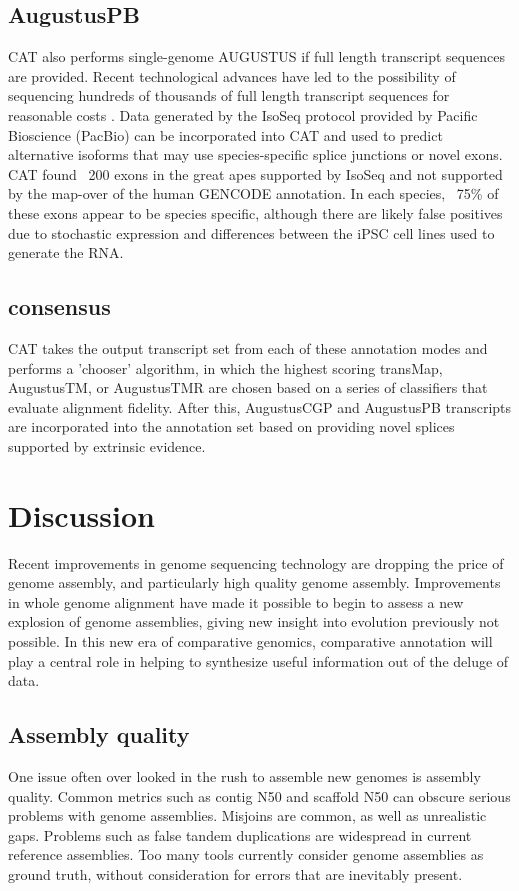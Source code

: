 \documentclass[fleqn,10pt]{wlscirep}
\begin{document}
\subsection*{AugustusPB}
CAT also performs single-genome AUGUSTUS if full length transcript sequences are provided. Recent technological advances have led to the possibility of sequencing hundreds of thousands of full length transcript sequences for reasonable costs \cite{korlach2017novo}. Data generated by the IsoSeq protocol provided by Pacific Bioscience (PacBio) \cite{gonzalez2016introduction} can be incorporated into CAT and used to predict alternative isoforms that may use species-specific splice junctions or novel exons. CAT found ~200 exons in the great apes supported by IsoSeq and not supported by the map-over of the human GENCODE annotation. In each species, ~75\% of these exons appear to be species specific, although there are likely false positives due to stochastic expression and differences between the iPSC cell lines used to generate the RNA.

\subsection*{consensus}

CAT takes the output transcript set from each of these annotation modes and performs a 'chooser' algorithm, in which the highest scoring transMap, AugustusTM, or AugustusTMR are chosen based on a series of classifiers that evaluate alignment fidelity. After this, AugustusCGP and AugustusPB transcripts are incorporated into the annotation set based on providing novel splices supported by extrinsic evidence.

\section*{Discussion}
Recent improvements in genome sequencing technology are dropping the price of genome assembly, and particularly high quality genome assembly. Improvements in whole genome alignment have made it possible to begin to assess a new explosion of genome assemblies, giving new insight into evolution previously not possible. In this new era of comparative genomics, comparative annotation will play a central role in helping to synthesize useful information out of the deluge of data.

\subsection*{Assembly quality}
One issue often over looked in the rush to assemble new genomes is assembly quality. Common metrics such as contig N50 and scaffold N50 can obscure serious problems with genome assemblies. Misjoins are common, as well as unrealistic gaps. Problems such as false tandem duplications are widespread in current reference assemblies. Too many tools currently consider genome assemblies as ground truth, without consideration for errors that are inevitably present.
\end{document}
